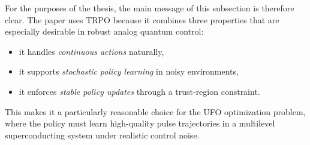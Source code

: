 For the purposes of the thesis, the main message of this subsection is therefore clear. The paper uses TRPO because it combines three properties that are especially desirable in robust analog quantum control:
\begin{itemize}
\item it handles \emph{continuous actions} naturally,
\item it supports \emph{stochastic policy learning} in noisy environments,
\item it enforces \emph{stable policy updates} through a trust-region constraint.
\end{itemize}
This makes it a particularly reasonable choice for the UFO optimization problem, where the policy must learn high-quality pulse trajectories in a multilevel superconducting system under realistic control noise.




